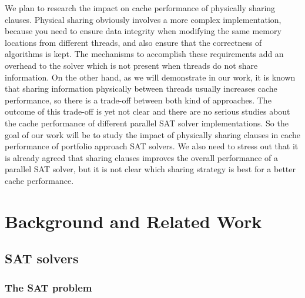 \documentclass[12pt]{diicc}
\begin{document}
We plan to research the impact on cache performance of physically sharing clauses. Physical sharing obviously involves a more complex implementation, because you need to ensure data integrity when modifying the same memory locations from different threads, and also ensure that the correctness of algorithms is kept. The mechanisms to accomplish these requirements add an overhead to the solver which is not present when threads do not share information. On the other hand, as we will demonstrate in our work, it is known that sharing information physically between threads usually increases cache performance, so there is a trade-off between both kind of approaches. The outcome of this trade-off is yet not clear and there are no serious studies about the cache performance of different parallel SAT solver implementations. So the goal of our work will be to study the impact of physically sharing clauses in cache performance of portfolio approach SAT solvers. We also need to stress out that it is already agreed that sharing clauses improves the overall performance of a parallel SAT solver\cite{psat}, but it is not clear which sharing strategy is best for a better cache performance.




%
% 
\chapter{Background and Related Work}\label{chap:background}
\section{SAT solvers}

\subsection{The SAT problem}
\end{document}
